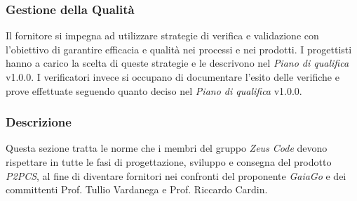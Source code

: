 	\subsubsection{Gestione della Qualità}
	Il fornitore si impegna ad utilizzare strategie di verifica e validazione con l'obiettivo di garantire efficacia e qualità nei processi e nei prodotti. I progettisti hanno a carico la scelta di queste strategie e le descrivono nel \textit{Piano di qualifica} v1.0.0. I verificatori invece si occupano di documentare l'esito delle verifiche e prove effettuate seguendo quanto deciso nel \textit{Piano di qualifica} v1.0.0.
	\subsubsection{Descrizione}
	Questa sezione tratta le norme che i membri del gruppo \textit{Zeus Code} devono rispettare in tutte le fasi di progettazione, sviluppo e consegna del prodotto \textit{P2PCS}, al fine di diventare fornitori nei confronti del proponente \textit{GaiaGo} e dei committenti Prof. Tullio Vardanega e Prof. Riccardo Cardin.

